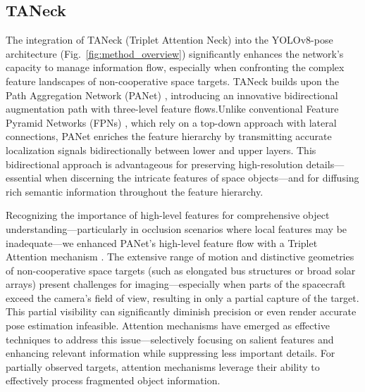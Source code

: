 \documentclass[a4paper,fleqn]{cas-sc}
\begin{document}
\subsection{TANeck}
The integration of TANeck (Triplet Attention Neck) into the YOLOv8-pose architecture (Fig.~\ref{fig:method_overview}) significantly enhances the network’s capacity to manage information flow, especially when confronting the complex feature landscapes of non-cooperative space targets. TANeck builds upon the Path Aggregation Network (PANet) \citep{panet}, introducing an innovative bidirectional augmentation path with three-level feature flows.Unlike conventional Feature Pyramid Networks (FPNs) \citep{fpn}, which rely on a top-down approach with lateral connections, PANet enriches the feature hierarchy by transmitting accurate localization signals bidirectionally between lower and upper layers. This bidirectional approach is advantageous for preserving high-resolution details—essential when discerning the intricate features of space objects—and for diffusing rich semantic information throughout the feature hierarchy.

Recognizing the importance of high-level features for comprehensive object understanding—particularly in occlusion scenarios where local features may be inadequate—we enhanced PANet’s high-level feature flow with a Triplet Attention mechanism \citep{triplet}. The extensive range of motion and distinctive geometries of non-cooperative space targets (such as elongated bus structures or broad solar arrays) present challenges for imaging—especially when parts of the spacecraft exceed the camera’s field of view, resulting in only a partial capture of the target. This partial visibility can significantly diminish precision or even render accurate pose estimation infeasible. Attention mechanisms have emerged as effective techniques to address this issue—selectively focusing on salient features and enhancing relevant information while suppressing less important details. For partially observed targets, attention mechanisms leverage their ability to effectively process fragmented object information.
\end{document}
